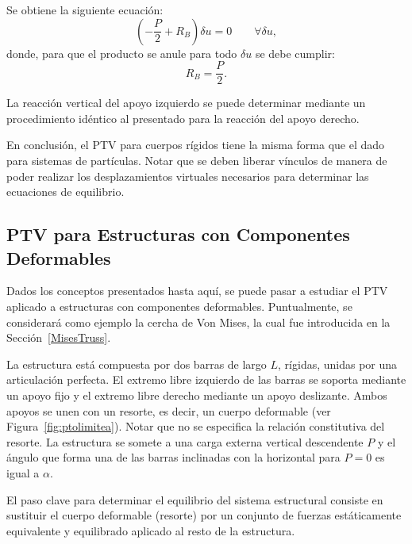 Se obtiene la siguiente ecuación:
%
\begin{equation}\label{PTVRigid}
\left( -\frac{P}{2} + R_B \right) \delta u = 0 \qquad \forall \delta u,
\end{equation}
%
donde, para que el producto se anule para todo $\delta u$ se debe cumplir:
%
\begin{equation}
R_B = \frac{P}{2}.
\end{equation}

La reacción vertical del apoyo izquierdo se puede determinar mediante un procedimiento idéntico al presentado para la reacción del apoyo derecho.

En conclusión, el PTV para cuerpos rígidos tiene la misma forma que el dado para sistemas de partículas. Notar que se deben liberar vínculos de manera de poder realizar los desplazamientos virtuales necesarios para determinar las ecuaciones de equilibrio.


\subsection{PTV para Estructuras con Componentes Deformables} \label{sec:ptvestdef}
Dados los conceptos presentados hasta aquí, se puede pasar a estudiar el PTV aplicado a estructuras con componentes deformables. %
%
Puntualmente, se considerará como ejemplo la cercha de Von Mises, la cual fue introducida en la Sección~\ref{MisesTruss}. 

La estructura está compuesta por dos barras de largo $L$, rígidas, unidas por una articulación perfecta. El extremo libre izquierdo de las barras se soporta mediante un apoyo fijo y el extremo libre derecho mediante un apoyo deslizante. %
%
Ambos apoyos se unen con un resorte, es decir, un cuerpo deformable (ver Figura~\ref{fig:ptolimitea}). %
%
Notar que no se especifica la relación constitutiva del resorte. La estructura se somete a una carga externa vertical descendente $P$ y el ángulo que forma una de las barras inclinadas con la horizontal para $P=0$ es igual a $\alpha$. 

El paso clave para determinar el equilibrio del sistema estructural consiste en sustituir el cuerpo deformable (resorte) por un conjunto de fuerzas estáticamente equivalente y equilibrado aplicado al resto de la estructura.

